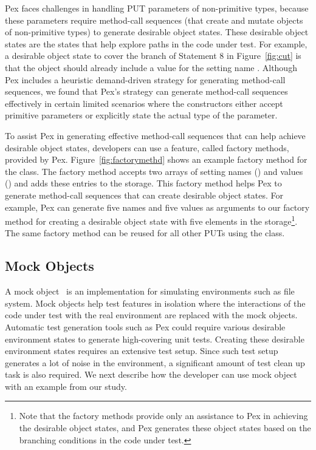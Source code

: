 Pex faces challenges in handling PUT parameters of non-primitive types, because these parameters require method-call sequences (that create and mutate objects of non-primitive types) to generate desirable object states. These desirable object states are the states that help explore paths in the code under test. For example, a desirable object state to cover the  branch of Statement 8 in Figure~\ref{fig:cut} is that the  object should already include a value for the setting name . Although Pex includes a heuristic demand-driven strategy for generating method-call sequences, we found that Pex's strategy can generate method-call sequences effectively in certain limited scenarios where the constructors either accept primitive parameters or explicitly state the actual type of the parameter.

To assist Pex in generating effective method-call sequences that can help achieve desirable object states, developers can use a feature, called factory methods, provided by Pex. Figure~\ref{fig:factorymethd} shows an example factory method for the  class. The factory method accepts two arrays of setting names () and values () and adds these entries to the storage. This factory method helps Pex to generate method-call sequences that can create desirable object states. For example, Pex can generate five names and five values as arguments to our factory method for creating a desirable object state with five elements in the storage\footnote{Note that the factory methods provide only an assistance to Pex in achieving the desirable object states, and Pex generates these object states based on the branching conditions in the code under test.}. The same factory method can be reused for all other PUTs using the  class.

\subsection{Mock Objects} 
\label{sec:mock}

A mock object~\cite{mockobjects} is an implementation for simulating environments such as file system. Mock objects help test features in isolation where the interactions of the code under test with the real environment are replaced with the mock objects. Automatic test generation tools such as Pex could require various desirable environment states to generate high-covering unit tests. Creating these desirable environment states requires an extensive test setup. Since such test setup generates a lot of noise in the environment, a significant amount of test clean up task is also required. We next describe how the developer can use mock object with an example from our study. 

